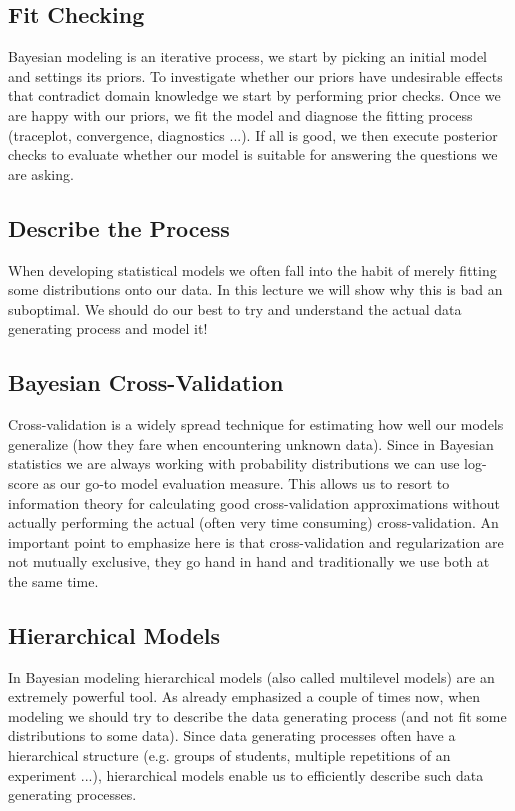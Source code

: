 \documentclass[fleqn,moreauthors,10pt]{ds_report}
\begin{document}
\subsection*{Fit Checking}

Bayesian modeling is an iterative process, we start by picking an initial model and settings its priors. To investigate whether our priors have undesirable effects that contradict domain knowledge we start by performing prior checks. Once we are happy with our priors, we fit the model and diagnose the fitting process (traceplot, convergence, diagnostics ...). If all is good, we then execute posterior checks to evaluate whether our model is suitable for answering the questions we are asking.

\subsection*{Describe the Process}

When developing statistical models we often fall into the habit of merely fitting some distributions onto our data. In this lecture we will show why this is bad an suboptimal. We should do our best to try and understand the actual data generating process and model it!

\subsection*{Bayesian Cross-Validation}

Cross-validation is a widely spread technique for estimating how well our models generalize (how they fare when encountering unknown data). Since in Bayesian statistics we are always working with probability distributions we can use log-score as our go-to model evaluation measure. This allows us to resort to information theory for calculating good cross-validation approximations without actually performing the actual (often very time consuming) cross-validation. An important point to emphasize here is that cross-validation and regularization are not mutually exclusive, they go hand in hand and traditionally we use both at the same time.

\subsection*{Hierarchical Models}

In Bayesian modeling hierarchical models (also called multilevel models) are an extremely powerful tool. As already emphasized a couple of times now, when modeling we should try to describe the data generating process (and not fit some distributions to some data). Since data generating processes often have a hierarchical structure (e.g. groups of students, multiple repetitions of an experiment ...), hierarchical models enable us to efficiently describe such data generating processes.
\end{document}

